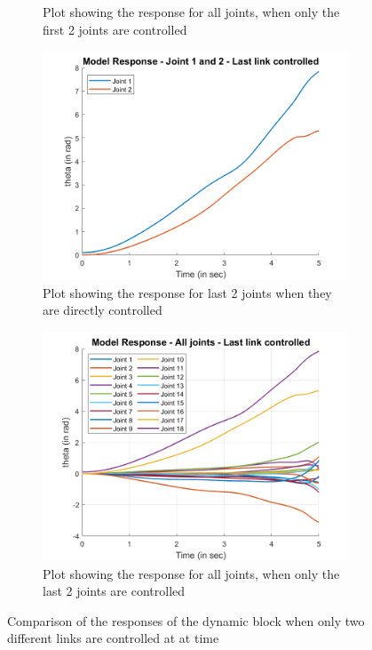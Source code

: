 \documentclass[a4paper,12pt]{report}
\begin{document}
\begin{figure}[ht]
\begin{subfigure}{0.5\textwidth}
		\caption{Plot showing the response for all joints, when only the first 2 joints are controlled}
	\end{subfigure}
	\begin{subfigure}{0.5\textwidth}
	\centering
	\includegraphics[width=\linewidth]{images/last-2.png}  
	\caption{Plot showing the response for last 2 joints when they are directly controlled}
	\end{subfigure}
	\begin{subfigure}{0.5\textwidth}
	\centering
	\includegraphics[width=\linewidth]{images/last-all.png}  
	\caption{Plot showing the response for all joints, when only the last 2 joints are controlled}
	\end{subfigure}
	\caption{Comparison of the responses of the dynamic block when only two different links are controlled at at time}
	\label{nth-link}
\end{figure}
\end{document}
